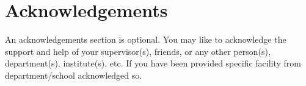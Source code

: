 \chapter*{\center \Large  Acknowledgements}
An acknowledgements section is optional. You may like to acknowledge the support and help of your supervisor(s), friends, or any other person(s), department(s), institute(s), etc. If you have been provided specific facility from department/school acknowledged so.  

